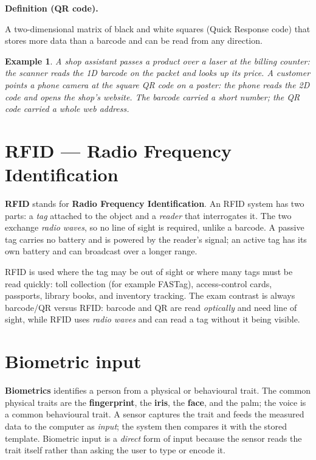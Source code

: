 \documentclass[11pt]{article}
\newtheorem{example}{Example}[section]
\newenvironment{definitionbox}[1]{%
  \par\noindent\textbf{Definition (#1).}\ \itshape
}{\par\vspace{0.3em}}
\begin{document}
\begin{definitionbox}{QR code}
A two-dimensional matrix of black and white squares (Quick Response code)
that stores more data than a barcode and can be read from any direction.
\end{definitionbox}

\begin{example}
A shop assistant passes a product over a laser at the billing counter: the
scanner reads the 1D \emph{barcode} on the packet and looks up its price. A
customer points a phone camera at the square \emph{QR code} on a poster: the
phone reads the 2D code and opens the shop's website. The barcode carried a
short number; the QR code carried a whole web address.
\end{example}

\section{RFID --- Radio Frequency Identification}
\textbf{RFID} stands for \textbf{Radio Frequency Identification}. An RFID
system has two parts: a \emph{tag} attached to the object and a \emph{reader}
that interrogates it. The two exchange \emph{radio waves}, so no line of
sight is required, unlike a barcode. A passive tag carries no battery and is
powered by the reader's signal; an active tag has its own battery and can
broadcast over a longer range.

RFID is used where the tag may be out of sight or where many tags must be
read quickly: toll collection (for example FASTag), access-control cards,
passports, library books, and inventory tracking. The exam contrast is
always barcode/QR versus RFID: barcode and QR are read \emph{optically} and
need line of sight, while RFID uses \emph{radio waves} and can read a tag
without it being visible.

\section{Biometric input}
\textbf{Biometrics} identifies a person from a physical or behavioural
trait. The common physical traits are the \textbf{fingerprint}, the
\textbf{iris}, the \textbf{face}, and the palm; the voice is a common
behavioural trait. A sensor captures the trait and feeds the measured data to
the computer as \emph{input}; the system then compares it with the stored
template. Biometric input is a \emph{direct} form of input because the sensor
reads the trait itself rather than asking the user to type or encode it.
\end{document}
